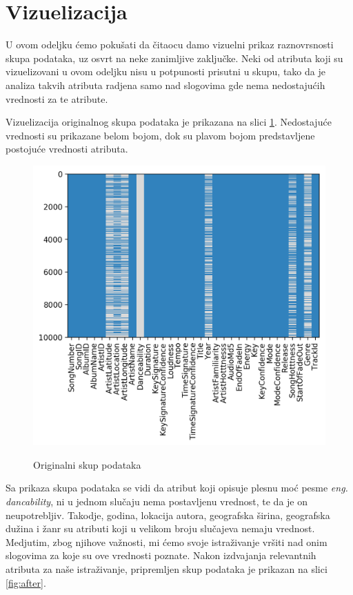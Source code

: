 \section{Vizuelizacija}
\label{sec:Vizuelizacija}

U ovom odeljku \'c{}emo poku\v{s}ati da \v{c}itaocu damo vizuelni prikaz raznovrsnosti skupa podataka, uz osvrt na neke zanimljive zaklju\v{c}ke. Neki od atributa koji su vizuelizovani u ovom odeljku nisu u potpunosti prisutni u skupu, tako da je analiza takvih atributa radjena samo nad slogovima gde nema nedostaju\'c{}ih vrednosti za te atribute.

Vizuelizacija originalnog skupa podataka je prikazana na slici \ref{fig:before}. Nedostaju\'c{}e vrednosti su prikazane belom bojom, dok su plavom bojom predstavljene postoju\'c{}e vrednosti atributa.
\begin{figure}[H]
    \centering
    \includegraphics[scale=0.6]{resources/before_processing.png}
    \label{fig:before}
    \caption{Originalni skup podataka}
\end{figure}

 Sa prikaza skupa podataka se vidi da atribut koji opisuje plesnu mo\'c{} pesme \emph{eng. dancability}, ni u jednom slu\v{c}aju nema postavljenu vrednost, te da je on neupotrebljiv. Takodje, godina, lokacija autora, geografska \v{s}irina, geografska du\v{z}ina i \v{z}anr su atributi koji u velikom broju slu\v{c}ajeva nemaju vrednost. Medjutim, zbog njihove va\v{z}nosti, mi \'c{}emo svoje istra\v{z}ivanje vr\v{s}iti nad onim slogovima za koje su ove vrednosti poznate. Nakon izdvajanja relevantnih atributa za na\v{s}e istra\v{z}ivanje, pripremljen skup podataka je prikazan na slici \ref{fig:after}.
 
